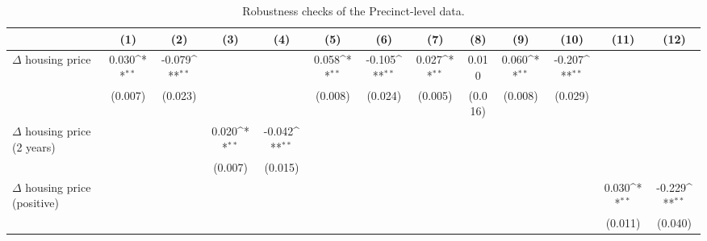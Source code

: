 \begin{sidewaystable}[htbp]\centering
\def\sym#1{\ifmmode^{#1}\else\(^{#1}\)\fi}
\caption{Robustness checks of the Precinct-level data.} \label{apdxprerobust}
\begin{tabular}{l*{12}{c}}
\hline\hline
                    &\multicolumn{1}{c}{(1)}        &\multicolumn{1}{c}{(2)}        &\multicolumn{1}{c}{(3)}        &\multicolumn{1}{c}{(4)}        &\multicolumn{1}{c}{(5)}        &\multicolumn{1}{c}{(6)}        &\multicolumn{1}{c}{(7)}        &\multicolumn{1}{c}{(8)}        &\multicolumn{1}{c}{(9)}        &\multicolumn{1}{c}{(10)}        &\multicolumn{1}{c}{(11)}        &\multicolumn{1}{c}{(12)}        \\
\hline
$\Delta$ housing price&       0.030\sym{**}&      -0.079\sym{**}&                    &                    &       0.058\sym{**}&      -0.105\sym{**}&       0.027\sym{**}&       0.010        &       0.060\sym{**}&      -0.207\sym{**}&                    &                    \\
                    &     (0.007)        &     (0.023)        &                    &                    &     (0.008)        &     (0.024)        &     (0.005)        &     (0.016)        &     (0.008)        &     (0.029)        &                    &                    \\
$\Delta$ housing price (2 years)&                    &                    &       0.020\sym{**}&      -0.042\sym{**}&                    &                    &                    &                    &                    &                    &                    &                    \\
                    &                    &                    &     (0.007)        &     (0.015)        &                    &                    &                    &                    &                    &                    &                    &                    \\
$\Delta$ housing price (positive)&                    &                    &                    &                    &                    &                    &                    &                    &                    &                    &       0.030\sym{**}&      -0.229\sym{**}\\
                    &                    &                    &                    &                    &                    &                    &                    &                    &                    &                    &     (0.011)        &     (0.040)        \\

\end{tabular}
\end{sidewaystable}
